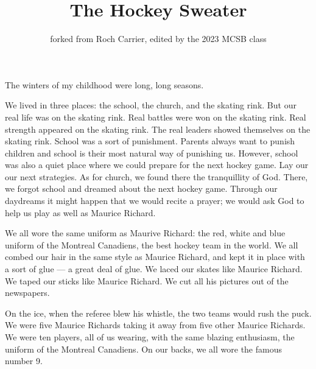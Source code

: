 \documentclass{article}
\title{The Hockey Sweater}
\author{forked from Roch Carrier, edited by the 2023 MCSB class}
\begin{document}
\maketitle

The winters of my childhood were long, long seasons.

We lived in three places: the school, the church, and the skating rink.
But our real life was on the skating rink. 
Real battles were won on the skating rink.
Real strength appeared on the skating rink.
The real leaders showed themselves on the skating rink.
School was a sort of punishment.
Parents always want to punish children and school is their most natural way of punishing us.
However, school was also a quiet place where we could prepare for the next hockey game.
Lay our our next strategies.
As for church, we found there the tranquillity of God.
There, we forgot school and dreamed about the next hockey game.
Through our daydreams it might happen that we would recite a prayer;
we would ask God to help us play as well as Maurice Richard.

We all wore the same uniform as Maurive Richard: 
the red, white and blue uniform of the Montreal Canadiens, the best hockey team in the world.
We all combed our hair in the same style as Maurice Richard, 
and kept it in place with a sort of glue --- a great deal of glue.
We laced our skates like Maurice Richard.
We taped our sticks like Maurice Richard.
We cut all his pictures out of the newspapers.

On the ice, when the referee blew his whistle, the two teams would rush the puck.
We were five Maurice Richards taking it away from five other Maurice Richards.
We were ten players, all of us wearing, with the same blazing enthusiasm, the uniform of the Montreal Canadiens.
On our backs, we all wore the famous number 9.
\end{document}
